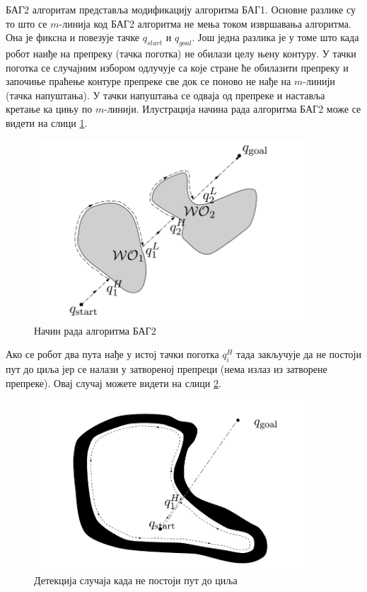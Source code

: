 \documentclass[12pt,oneside]{memoir}
\theoremstyle{remark}
\begin{document}
БАГ2 алгоритам представља модификацију алгоритма БАГ1. Основне разлике су то што се $m$-линија код БАГ2 алгоритма не мења током извршавања алгоритма. Она је фиксна и повезује тачке $q_{start}$ и $q_{goal}$. Још једна разлика је у томе што када робот наиђе на препреку (тачка поготка) не обилази целу њену контуру. У тачки поготка се случајним избором одлучује са које стране ће обилазити препреку и започиње праћење контуре препреке све док се поново не нађе на $m$-линији (тачка напуштања). У тачки напуштања се одваја од препреке и наставља кретање ка цињу по $m$-линији. Илустрација начина рада алгоритма БАГ2 може се видети на слици \ref{fig:bug2}.
\begin{figure}[!ht]
\centering
\includegraphics[width=0.9\textwidth]{slike/bug2.png}
\caption{Начин рада алгоритма БАГ2}
\label{fig:bug2}
\end{figure}
Ако се робот два пута нађе у истој тачки поготка $q_i^H$ тада закључује да не постоји пут до циља јер се налази у затвореној препреци (нема излаз из затворене препреке). Овај случај можете видети на слици \ref{fig:bug2f}.

\begin{figure}[!ht]
\centering
\includegraphics[width=0.9\textwidth]{slike/bug2f.png}
\caption{Детекција случаја када не постоји пут до циља}
\label{fig:bug2f}
\end{figure}
\end{document}
